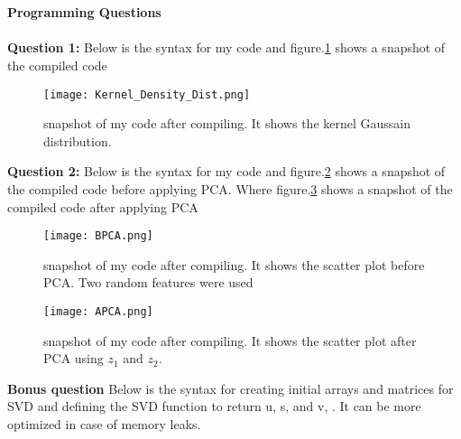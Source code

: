 \documentclass{article}
\begin{document}
\\
\\
\textbf{Programming Questions}
\\
\\
\textbf{Question 1:}
\newline
Below is the syntax for my code and figure.\ref{kernel} shows a snapshot of the compiled code
\begin{figure}
  \texttt{[image: Kernel\_Density\_Dist.png]}
  \caption{snapshot of my code after compiling. It shows the kernel Gaussain distribution.}
\label{kernel}
\end{figure}


\textbf{Question 2:}
\newline
\newline
Below is the syntax for my code and figure.\ref{BPCA} shows a snapshot of the compiled code before applying PCA. Where figure.\ref{APCA} shows a snapshot of the compiled code after applying PCA

\begin{figure}
  \texttt{[image: BPCA.png]}
  \caption{snapshot of my code after compiling. It shows the scatter plot before PCA. Two random features were used}
\label{BPCA}
\end{figure}
\begin{figure}
  \texttt{[image: APCA.png]}
  \caption{snapshot of my code after compiling. It shows the scatter plot after PCA using $z_{1}$ and $z_{2}$.}
\label{APCA}
\end{figure}
\textbf{Bonus question}
Below is the syntax  for creating initial arrays and matrices for SVD and defining the SVD function to return u, s, and v, . It can be more optimized in case of memory leaks.

\end{document}
